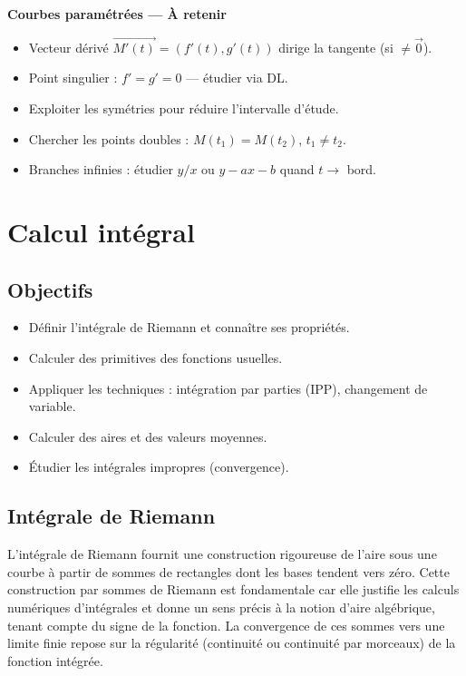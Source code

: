 \documentclass[11pt,a4paper,twoside]{book}
\begin{document}
\begin{retenirbox}
\textbf{Courbes paramétrées — À retenir}
\begin{itemize}
  \item Vecteur dérivé $\vec{M'(t)}=(f'(t),g'(t))$ dirige la tangente (si $\neq\vec{0}$).
  \item Point singulier : $f'=g'=0$ — étudier via DL.
  \item Exploiter les symétries pour réduire l'intervalle d'étude.
  \item Chercher les points doubles : $M(t_1)=M(t_2)$, $t_1\neq t_2$.
  \item Branches infinies : étudier $y/x$ ou $y-ax-b$ quand $t\to$ bord.
\end{itemize}
\end{retenirbox}

\chapter{Calcul intégral}

\section*{Objectifs}
\begin{itemize}[leftmargin=1.5em]
  \item Définir l'intégrale de Riemann et connaître ses propriétés.
  \item Calculer des primitives des fonctions usuelles.
  \item Appliquer les techniques : intégration par parties (IPP), changement de variable.
  \item Calculer des aires et des valeurs moyennes.
  \item Étudier les intégrales impropres (convergence).
\end{itemize}

\section{Intégrale de Riemann}

L'intégrale de Riemann fournit une construction rigoureuse de l'aire sous une courbe à partir de sommes de rectangles dont les bases tendent vers zéro. Cette construction par sommes de Riemann est fondamentale car elle justifie les calculs numériques d'intégrales et donne un sens précis à la notion d'aire algébrique, tenant compte du signe de la fonction. La convergence de ces sommes vers une limite finie repose sur la régularité (continuité ou continuité par morceaux) de la fonction intégrée.
\end{document}
